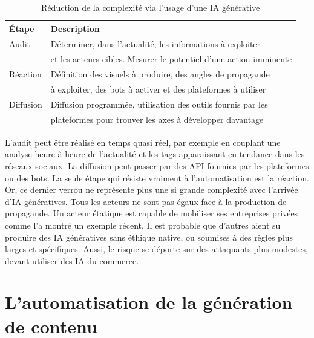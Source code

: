 \documentclass[11pt]{article}
\begin{document}
		
		\begin{table}[H]
			\centering
			\begin{tabular}{|l|l|}
				\hline 
				Étape & Description \\
				\hline 
				Audit & Déterminer, dans l'actualité, les informations à exploiter \\
			 & et les acteurs cibles. Mesurer le potentiel d'une action imminente \\
				\hline 
				Réaction & Définition des visuels à produire, des angles de propagande\\
			 & à exploiter, des bots à activer et des plateformes à utiliser \\
				\hline 
				Diffusion & Diffusion programmée, utilisation des outils fournis par les \\
			 & plateformes pour trouver les axes à développer davantage \\
				\hline 
			\end{tabular}
			\caption{Réduction de la complexité via l'usage d'une IA générative}
		\end{table}
		
		
		L'audit peut être réalisé en temps quasi réel, par exemple en couplant une analyse heure à heure de l'actualité et les tags apparaissant en tendance dans les réseaux sociaux. La diffusion peut passer par des API fournies par les plateformes ou des bots. La seule étape qui résiste vraiment à l'automatisation est la réaction. Or, ce dernier verrou ne représente plus une si grande complexité avec l'arrivée d'IA génératives. Tous les acteurs ne sont pas égaux face à la production de propagande. Un acteur étatique est capable de mobiliser ses entreprises privées comme l'a montré un exemple récent. Il est probable que d'autres aient su produire des IA génératives sans éthique native, ou soumises à des règles plus larges et spécifiques. Aussi, le risque se déporte sur des attaquants plus modestes, devant utiliser des IA du commerce. 
			
			
	\section{L'automatisation de la génération de contenu}
	
\end{document}
